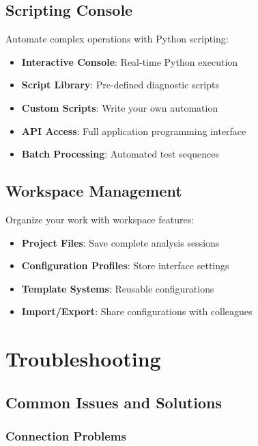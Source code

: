 \documentclass[11pt,a4paper]{article}
\begin{document}
\subsection{Scripting Console}

Automate complex operations with Python scripting:

\begin{itemize}
    \item \textbf{Interactive Console}: Real-time Python execution
    \item \textbf{Script Library}: Pre-defined diagnostic scripts
    \item \textbf{Custom Scripts}: Write your own automation
    \item \textbf{API Access}: Full application programming interface
    \item \textbf{Batch Processing}: Automated test sequences
\end{itemize}

\subsection{Workspace Management}

Organize your work with workspace features:

\begin{itemize}
    \item \textbf{Project Files}: Save complete analysis sessions
    \item \textbf{Configuration Profiles}: Store interface settings
    \item \textbf{Template Systems}: Reusable configurations
    \item \textbf{Import/Export}: Share configurations with colleagues
\end{itemize}

\section{Troubleshooting}

\subsection{Common Issues and Solutions}

\subsubsection{Connection Problems}
\end{document}
